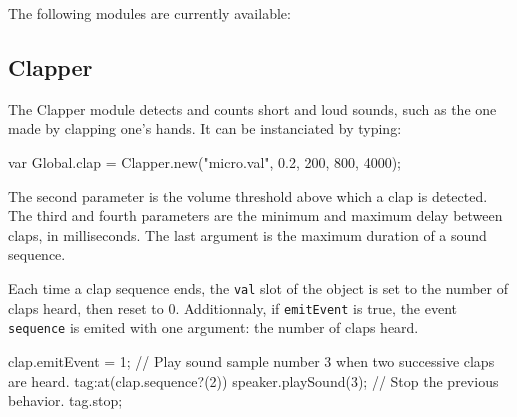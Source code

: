 The following modules are currently available:

\subsection{Clapper}

The Clapper module detects and counts short and loud sounds, such as the one
made by clapping one's hands. It can be instanciated by typing:

\begin{urbiunchecked}
var Global.clap = Clapper.new("micro.val", 0.2, 200, 800, 4000);
\end{urbiunchecked}

The second parameter is the volume threshold above which a clap is detected.
The third and fourth parameters are the minimum and maximum delay between claps,
in milliseconds. The last argument is the maximum duration of a sound sequence.

Each time a clap sequence ends, the \lstinline|val| slot of the object is
set to the number of claps heard, then reset to 0.
Additionnaly, if \lstinline|emitEvent| is true, the event \lstinline|sequence|
is emited with one argument: the number of claps heard.

\begin{urbiunchecked}
clap.emitEvent = 1;
// Play sound sample number 3 when two successive claps are heard.
tag:at(clap.sequence?(2)) speaker.playSound(3);
// Stop the previous behavior.
tag.stop;
\end{urbiunchecked}
